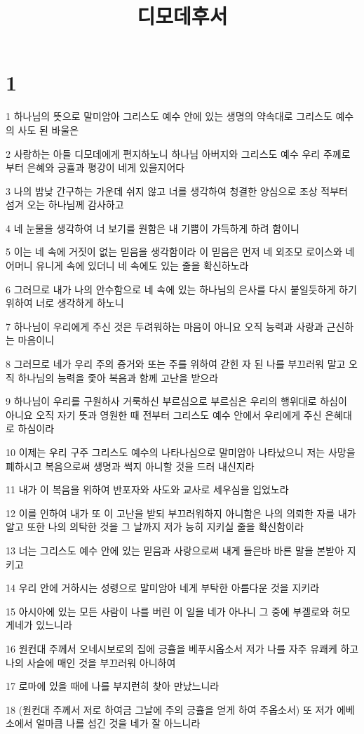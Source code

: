 

\title{디모데후서}


\chapter{1}

\par 1 하나님의 뜻으로 말미암아 그리스도 예수 안에 있는 생명의 약속대로 그리스도 예수의 사도 된 바울은
\par 2 사랑하는 아들 디모데에게 편지하노니 하나님 아버지와 그리스도 예수 우리 주께로부터 은혜와 긍휼과 평강이 네게 있을지어다
\par 3 나의 밤낮 간구하는 가운데 쉬지 않고 너를 생각하여 청결한 양심으로 조상 적부터 섬겨 오는 하나님께 감사하고
\par 4 네 눈물을 생각하여 너 보기를 원함은 내 기쁨이 가득하게 하려 함이니
\par 5 이는 네 속에 거짓이 없는 믿음을 생각함이라 이 믿음은 먼저 네 외조모 로이스와 네 어머니 유니게 속에 있더니 네 속에도 있는 줄을 확신하노라
\par 6 그러므로 내가 나의 안수함으로 네 속에 있는 하나님의 은사를 다시 붙일듯하게 하기 위하여 너로 생각하게 하노니
\par 7 하나님이 우리에게 주신 것은 두려워하는 마음이 아니요 오직 능력과 사랑과 근신하는 마음이니
\par 8 그러므로 네가 우리 주의 증거와 또는 주를 위하여 갇힌 자 된 나를 부끄러워 말고 오직 하나님의 능력을 좇아 복음과 함께 고난을 받으라
\par 9 하나님이 우리를 구원하사 거룩하신 부르심으로 부르심은 우리의 행위대로 하심이 아니요 오직 자기 뜻과 영원한 때 전부터 그리스도 예수 안에서 우리에게 주신 은혜대로 하심이라
\par 10 이제는 우리 구주 그리스도 예수의 나타나심으로 말미암아 나타났으니 저는 사망을 폐하시고 복음으로써 생명과 썩지 아니할 것을 드러 내신지라
\par 11 내가 이 복음을 위하여 반포자와 사도와 교사로 세우심을 입었노라
\par 12 이를 인하여 내가 또 이 고난을 받되 부끄러워하지 아니함은 나의 의뢰한 자를 내가 알고 또한 나의 의탁한 것을 그 날까지 저가 능히 지키실 줄을 확신함이라
\par 13 너는 그리스도 예수 안에 있는 믿음과 사랑으로써 내게 들은바 바른 말을 본받아 지키고
\par 14 우리 안에 거하시는 성령으로 말미암아 네게 부탁한 아름다운 것을 지키라
\par 15 아시아에 있는 모든 사람이 나를 버린 이 일을 네가 아나니 그 중에 부겔로와 허모게네가 있느니라
\par 16 원컨대 주께서 오네시보로의 집에 긍휼을 베푸시옵소서 저가 나를 자주 유쾌케 하고 나의 사슬에 매인 것을 부끄러워 아니하여
\par 17 로마에 있을 때에 나를 부지런히 찾아 만났느니라
\par 18 (원컨대 주께서 저로 하여금 그날에 주의 긍휼을 얻게 하여 주옵소서) 또 저가 에베소에서 얼마큼 나를 섬긴 것을 네가 잘 아느니라


